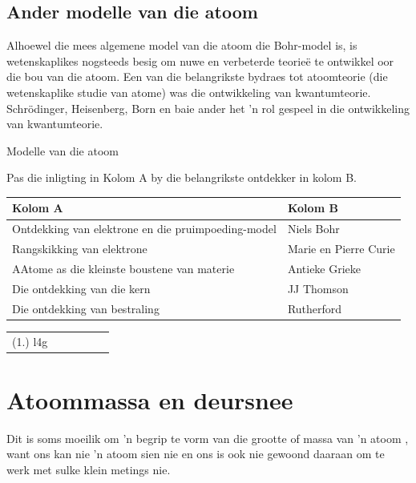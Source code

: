            \subsection*{Ander modelle van die atoom}
            \nopagebreak
            \label{m38756*eip-993}
Alhoewel die mees algemene model van die atoom die Bohr-model is, is wetenskaplikes nogsteeds besig om nuwe en verbeterde teorieë te ontwikkel oor die bou van die atoom. Een van die belangrikste bydraes tot atoomteorie (die wetenskaplike studie van atome) was die ontwikkeling van kwantumteorie. Schrödinger, Heisenberg, Born en baie ander het  'n rol gespeel in die ontwikkeling van kwantumteorie. 
\par \label{m38756*eip-179}
            \begin{exercises}{Modelle van die atoom}
{
            \nopagebreak
            \label{m38756*eip-786}Pas die inligting in Kolom A by die belangrikste ontdekker in kolom B.
          \begin{table}[H]
        \begin{center}
      \label{m38756*eip-551}
      \begin{tabular}{|l|l|}\hline
        Kolom A &
        Kolom B \\ \hline
        Ontdekking van elektrone en die pruimpoeding-model & Niels Bohr \\ \hline
        Rangskikking van elektrone & Marie en Pierre Curie  \\ \hline
        AAtome as die kleinste boustene van materie & Antieke Grieke \\ \hline
        Die ontdekking van die kern & JJ Thomson \\ \hline
        Die ontdekking van bestraling & Rutherford \\ \hline
    \end{tabular}
      \end{center}
\end{table}

\practiceinfo
 \par \begin{tabular}[h]{cccccc}
 (1.) l4g  &
\end{tabular}
}
\end{exercises}

            \section{Atoommassa en deursnee}
            \nopagebreak
            \label{m38756*id254850}Dit is soms moeilik om  'n begrip te vorm van die grootte of massa van  'n atoom , want ons kan nie   'n atoom sien nie en ons is ook nie gewoond daaraan om te werk met sulke klein metings nie.\par 
      \label{m38756*uid7}
